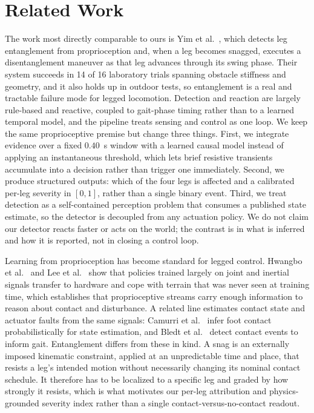 \documentclass[conference]{IEEEtran}
\begin{document}
\section{Related Work}

The work most directly comparable to ours is Yim et al.~\cite{yim2023entanglement}, which detects leg entanglement from proprioception and, when a leg becomes snagged, executes a disentanglement maneuver as that leg advances through its swing phase. Their system succeeds in 14 of 16 laboratory trials spanning obstacle stiffness and geometry, and it also holds up in outdoor tests, so entanglement is a real and tractable failure mode for legged locomotion. Detection and reaction are largely rule-based and reactive, coupled to gait-phase timing rather than to a learned temporal model, and the pipeline treats sensing and control as one loop. We keep the same proprioceptive premise but change three things. First, we integrate evidence over a fixed $0.40$~s window with a learned causal model instead of applying an instantaneous threshold, which lets brief resistive transients accumulate into a decision rather than trigger one immediately. Second, we produce structured outputs: which of the four legs is affected and a calibrated per-leg severity in $[0,1]$, rather than a single binary event. Third, we treat detection as a self-contained perception problem that consumes a published state estimate, so the detector is decoupled from any actuation policy. We do not claim our detector reacts faster or acts on the world; the contrast is in what is inferred and how it is reported, not in closing a control loop.

Learning from proprioception has become standard for legged control. Hwangbo et al.~\cite{hwangbo2019learning} and Lee et al.~\cite{lee2020learning} show that policies trained largely on joint and inertial signals transfer to hardware and cope with terrain that was never seen at training time, which establishes that proprioceptive streams carry enough information to reason about contact and disturbance. A related line estimates contact state and actuator faults from the same signals: Camurri et al.~\cite{camurri2017contact} infer foot contact probabilistically for state estimation, and Bledt et al.~\cite{bledt2018contact} detect contact events to inform gait. Entanglement differs from these in kind. A snag is an externally imposed kinematic constraint, applied at an unpredictable time and place, that resists a leg's intended motion without necessarily changing its nominal contact schedule. It therefore has to be localized to a specific leg and graded by how strongly it resists, which is what motivates our per-leg attribution and physics-grounded severity index rather than a single contact-versus-no-contact readout.
\end{document}
